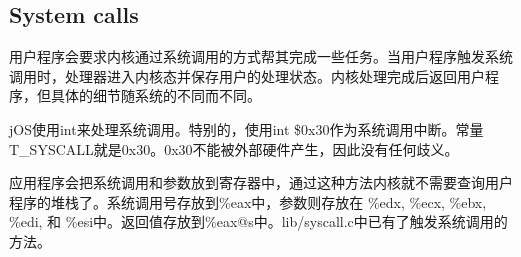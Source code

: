 \subsection{System calls}
\par 用户程序会要求内核通过系统调用的方式帮其完成一些任务。当用户程序触发系统调用时，处理器进入内核态并保存用户的处理状态。内核处理完成后返回用户程序，但具体的细节随系统的不同而不同。
\par jOS使用int来处理系统调用。特别的，使用int \$0x30作为系统调用中断。常量T\_SYSCALL就是0x30。0x30不能被外部硬件产生，因此没有任何歧义。
\par 应用程序会把系统调用和参数放到寄存器中，通过这种方法内核就不需要查询用户程序的堆栈了。系统调用号存放到\%eax中，参数则存放在 \%edx, \%ecx, \%ebx, \%edi, 和 \%esi中。返回值存放到\%eax@s中。lib/syscall.c中已有了触发系统调用的方法。
